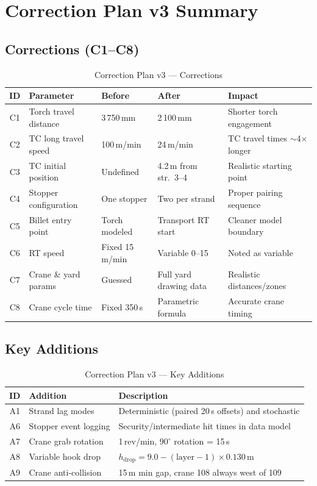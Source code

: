 \documentclass[11pt,a4paper]{article}
\begin{document}
\section{Correction Plan v3 Summary}
\label{sec:correction-plan}

\subsection{Corrections (C1--C8)}

\begin{table}[H]
\centering
\caption{Correction Plan v3 --- Corrections}
\label{tab:corrections}
\begin{tabular}{@{}clllp{5cm}@{}}
\toprule
ID & Parameter & Before & After & Impact \\
\midrule
C1 & Torch travel distance & 3\,750\,mm & 2\,100\,mm & Shorter torch engagement \\
C2 & TC long travel speed & 100\,m/min & 24\,m/min & TC travel times $\sim$4$\times$ longer \\
C3 & TC initial position & Undefined & 4.2\,m from str.~3--4 & Realistic starting point \\
C4 & Stopper configuration & One stopper & Two per strand & Proper pairing sequence \\
C5 & Billet entry point & Torch modeled & Transport RT start & Cleaner model boundary \\
C6 & RT speed & Fixed 15\,m/min & Variable 0--15 & Noted as variable \\
C7 & Crane \& yard params & Guessed & Full yard drawing data & Realistic distances/zones \\
C8 & Crane cycle time & Fixed 350\,s & Parametric formula & Accurate crane timing \\
\bottomrule
\end{tabular}
\end{table}

\subsection{Key Additions}

\begin{table}[H]
\centering
\caption{Correction Plan v3 --- Key Additions}
\label{tab:additions}
\begin{tabular}{@{}clp{8cm}@{}}
\toprule
ID & Addition & Description \\
\midrule
A1 & Strand lag modes & Deterministic (paired 20\,s offsets) and stochastic \\
A6 & Stopper event logging & Security/intermediate hit times in data model \\
A7 & Crane grab rotation & 1\,rev/min, $90^\circ$ rotation = 15\,s \\
A8 & Variable hook drop & $h_\text{drop} = 9.0 - (\text{layer}-1) \times 0.130$\,m \\
A9 & Crane anti-collision & 15\,m min gap, crane 108 always west of 109 \\
\bottomrule
\end{tabular}
\end{table}
\end{document}
